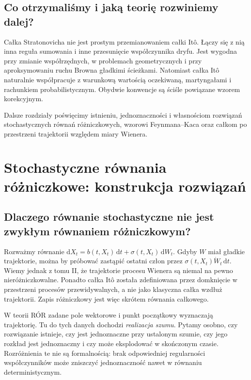 \documentclass[11pt,a4paper,oneside]{report}
\numberwithin{equation}{chapter}
\theoremstyle{plain}
\theoremstyle{definition}
\theoremstyle{remark}
\newcommand{\dd}{\mathrm{d}}
\begin{document}
\section{Co otrzymaliśmy i jaką teorię rozwiniemy dalej?}
Całka Stratonovicha nie jest prostym przemianowaniem
całki Itô. Łączy się z nią inna reguła sumowania i
inne przesunięcie współczynnika dryfu. Jest wygodna
przy zmianie współrzędnych, w problemach geometrycznych
i przy aproksymowaniu ruchu Browna gładkimi ścieżkami.
Natomiast całka Itô naturalnie współpracuje z
warunkową wartością oczekiwaną, martyngałami i
rachunkiem probabilistycznym. Obydwie konwencje są
ściśle powiązane wzorem korekcyjnym.

Dalsze rozdziały poświęcimy istnieniu, jednoznaczności
i własnościom rozwiązań stochastycznych równań
różniczkowych, wzorowi Feynmana--Kaca oraz całkom
po przestrzeni trajektorii względem miary Wienera.


\chapter{Stochastyczne równania różniczkowe: konstrukcja rozwiązań}
\label{ch:sde-existence}

\section{Dlaczego równanie stochastyczne nie jest zwykłym równaniem różniczkowym?}
Rozważmy równanie $\dd X_t=b(t,X_t)\,\dd t+\sigma(t,X_t)\,\dd W_t$.
Gdyby $W$ miał gładkie trajektorie, można by próbować zastąpić
ostatni człon przez $\sigma(t,X_t)\dot W_t\,\dd t$.
Wiemy jednak z tomu II, że trajektorie procesu Wienera
są niemal na pewno nieróżniczkowalne. Ponadto całka Itô
została zdefiniowana przez domknięcie w przestrzeni procesów
przewidywalnych, a nie jako klasyczna całka wzdłuż trajektorii.
Zapis różniczkowy jest więc skrótem równania całkowego.

W teorii RÓR zadane pole wektorowe i punkt początkowy wyznaczają
trajektorię. Tu do tych danych dochodzi \emph{realizacja szumu}.
Pytamy osobno, czy rozwiązanie istnieje, czy jest jednoznaczne
przy ustalonym szumie, czy jego rozkład jest jednoznaczny i czy
może eksplodować w skończonym czasie. Rozróżnienia te nie są
formalnością: brak odpowiedniej regularności współczynników
może zniszczyć jednoznaczność nawet w równaniu deterministycznym.
\end{document}
